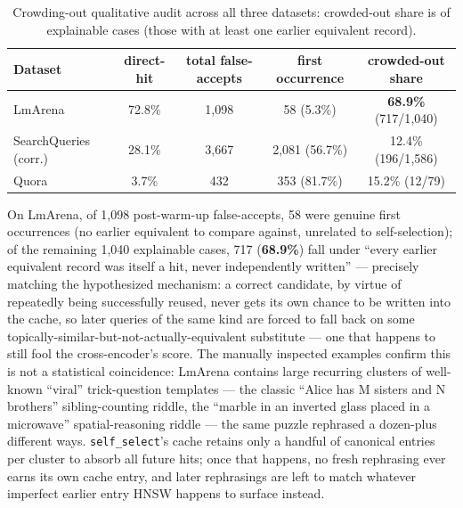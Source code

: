 \documentclass[11pt]{article}
\newenvironment{fittab}{\begin{lrbox}{\fittabbox}}{\end{lrbox}%
  \ifdim\wd\fittabbox>\linewidth\resizebox{\linewidth}{!}{\usebox{\fittabbox}}\else\usebox{\fittabbox}\fi}
\begin{document}
\begin{table}[h]
\centering
\small
\begin{fittab}\begin{tabular}{@{}lcccc@{}}
\toprule
\textbf{Dataset} & \textbf{direct-hit} & \textbf{total false-accepts} & \textbf{first occurrence} & \textbf{crowded-out share} \\
\midrule
LmArena & 72.8\% & 1{,}098 & 58 (5.3\%) & \textbf{68.9\%} (717/1{,}040) \\
SearchQueries (corr.) & 28.1\% & 3{,}667 & 2{,}081 (56.7\%) & 12.4\% (196/1{,}586) \\
Quora & 3.7\% & 432 & 353 (81.7\%) & 15.2\% (12/79) \\
\bottomrule
\end{tabular}\end{fittab}
\caption{Crowding-out qualitative audit across all three datasets: crowded-out share is of explainable cases (those with at least one earlier equivalent record).}
\end{table}

On LmArena, of 1{,}098 post-warm-up false-accepts, 58 were genuine first occurrences (no earlier equivalent to compare against, unrelated to self-selection); of the remaining 1{,}040 explainable cases, 717 (\textbf{68.9\%}) fall under ``every earlier equivalent record was itself a hit, never independently written'' --- precisely matching the hypothesized mechanism: a correct candidate, by virtue of repeatedly being successfully reused, never gets its own chance to be written into the cache, so later queries of the same kind are forced to fall back on some topically-similar-but-not-actually-equivalent substitute --- one that happens to still fool the cross-encoder's score. The manually inspected examples confirm this is not a statistical coincidence: LmArena contains large recurring clusters of well-known ``viral'' trick-question templates --- the classic ``Alice has M sisters and N brothers'' sibling-counting riddle, the ``marble in an inverted glass placed in a microwave'' spatial-reasoning riddle --- the same puzzle rephrased a dozen-plus different ways. \texttt{self\_\allowbreak{}select}'s cache retains only a handful of canonical entries per cluster to absorb all future hits; once that happens, no fresh rephrasing ever earns its own cache entry, and later rephrasings are left to match whatever imperfect earlier entry HNSW happens to surface instead.
\end{document}
